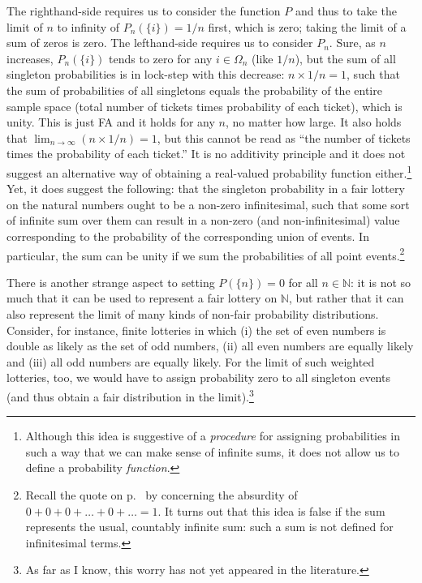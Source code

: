 The righthand-side requires us to consider the function $P$ and thus to take the limit of $n$ to infinity of $P_n(\{i\})=1/n$ first, which is zero; taking the limit of a sum of zeros is zero.
The lefthand-side requires us to consider $P_n$. Sure, as $n$ increases, $P_n(\{i\})$ tends to zero for any $i \in \Omega_n$ (like $1/n$), but the sum of all singleton probabilities is in lock-step with this decrease: $n \times  1/n=1$, such that the sum of probabilities of all singletons equals the probability of the entire sample space (total number of tickets times probability of each ticket), which is unity. This is just FA and it holds for any $n$, no matter how large. It also holds that $\lim_{n\rightarrow\infty} (n \times  1/n)=1$, but this cannot be read as ``the number of tickets times the probability of each ticket.'' It is no additivity principle and it does not suggest an alternative way of obtaining a real-valued probability function either.\footnote{Although this idea is suggestive of a \emph{procedure} for assigning probabilities in such a way that we can make sense of infinite sums, it does not allow us to define a probability \emph{function}.}
Yet, it does suggest the following: that the singleton probability in a fair lottery on the natural numbers ought to be a non-zero infinitesimal, such that some sort of infinite sum over them can result in a non-zero (and non-infinitesimal) value corresponding to the probability of the corresponding union of events.
In particular, the sum can be unity if we sum the probabilities of all point events.\footnote{Recall the quote on p.~\pageref{quote:dF} by \citet[p.~347]{deFinetti:1974} concerning the absurdity of $0+0+0+ \ldots +0+ \ldots =1$. It turns out that this idea is false if the sum represents the usual, countably infinite sum: such a sum is not defined for infinitesimal terms.}

There is another strange aspect to setting $P(\{n\})=0$ for all $n \in \mathbb{N}$: it is not so much that it can be used to represent a fair lottery on $\mathbb{N}$, but rather that it can also represent the limit of many kinds of non-fair probability distributions. Consider, for instance, finite lotteries in which (i) the set of even numbers is double as likely as the set of odd numbers, (ii) all even numbers are equally likely and (iii) all odd numbers are equally likely. For the limit of such weighted lotteries, too, we would have to assign probability zero to all singleton events (and thus obtain a fair distribution in the limit).\footnote{As far as I know, this worry has not yet appeared in the literature.}

